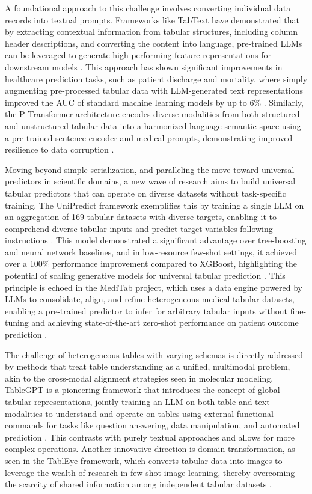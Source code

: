 \documentclass[11pt]{article}
\begin{document}
A foundational approach to this challenge involves converting individual data records into textual prompts. Frameworks like TabText have demonstrated that by extracting contextual information from tabular structures, including column header descriptions, and converting the content into language, pre-trained LLMs can be leveraged to generate high-performing feature representations for downstream models \cite{ref545}. This approach has shown significant improvements in healthcare prediction tasks, such as patient discharge and mortality, where simply augmenting pre-processed tabular data with LLM-generated text representations improved the AUC of standard machine learning models by up to 6\% \cite{ref545}. Similarly, the P-Transformer architecture encodes diverse modalities from both structured and unstructured tabular data into a harmonized language semantic space using a pre-trained sentence encoder and medical prompts, demonstrating improved resilience to data corruption \cite{ref546}.

Moving beyond simple serialization, and paralleling the move toward universal predictors in scientific domains, a new wave of research aims to build universal tabular predictors that can operate on diverse datasets without task-specific training. The UniPredict framework exemplifies this by training a single LLM on an aggregation of 169 tabular datasets with diverse targets, enabling it to comprehend diverse tabular inputs and predict target variables following instructions \cite{ref547}. This model demonstrated a significant advantage over tree-boosting and neural network baselines, and in low-resource few-shot settings, it achieved over a 100\% performance improvement compared to XGBoost, highlighting the potential of scaling generative models for universal tabular prediction \cite{ref547}. This principle is echoed in the MediTab project, which uses a data engine powered by LLMs to consolidate, align, and refine heterogeneous medical tabular datasets, enabling a pre-trained predictor to infer for arbitrary tabular inputs without fine-tuning and achieving state-of-the-art zero-shot performance on patient outcome prediction \cite{ref548}.

The challenge of heterogeneous tables with varying schemas is directly addressed by methods that treat table understanding as a unified, multimodal problem, akin to the cross-modal alignment strategies seen in molecular modeling. TableGPT is a pioneering framework that introduces the concept of global tabular representations, jointly training an LLM on both table and text modalities to understand and operate on tables using external functional commands for tasks like question answering, data manipulation, and automated prediction \cite{ref549}. This contrasts with purely textual approaches and allows for more complex operations. Another innovative direction is domain transformation, as seen in the TablEye framework, which converts tabular data into images to leverage the wealth of research in few-shot image learning, thereby overcoming the scarcity of shared information among independent tabular datasets \cite{ref550}.
\end{document}
